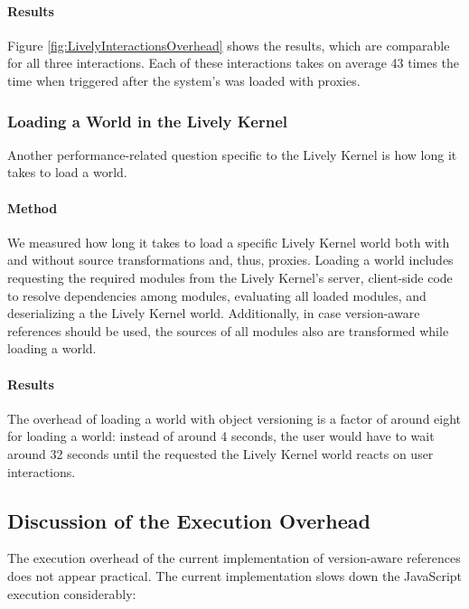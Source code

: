 \paragraph{Results}
Figure \ref{fig:LivelyInteractionsOverhead} shows the results, which are comparable for all three interactions.
Each of these interactions takes on average 43 times the time when triggered after the system's was loaded with proxies.



\subsubsection{Loading a World in the Lively Kernel}

Another performance-related question specific to the Lively Kernel is how long it takes to load a world.

\paragraph{Method}
We measured how long it takes to load a specific Lively Kernel world both with and without source transformations and, thus, proxies.
Loading a world includes requesting the required modules from the Lively Kernel's server, client-side code to resolve dependencies among modules, evaluating all loaded modules, and deserializing a the Lively Kernel world.
Additionally, in case version-aware references should be used, the sources of all modules also are transformed while loading a world.

\paragraph{Results}
The overhead of loading a world with object versioning is a factor of around eight for loading a world: instead of around 4 seconds, the user would have to wait around 32 seconds until the requested the Lively Kernel world reacts on user interactions.




\subsection{Discussion of the Execution Overhead}

The execution overhead of the current implementation of version-aware references does not appear practical.
The current implementation slows down the JavaScript execution considerably: 

